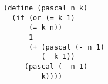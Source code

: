 \documentclass[a4paper,12pt]{article}
\begin{document}
\begin{lstlisting}
(define (pascal n k)
  (if (or (= k 1)
	  (= k n))
      1
      (+ (pascal (- n 1)
		 (- k 1))
	 (pascal (- n 1)
		 k))))
\end{lstlisting}
\end{document}
